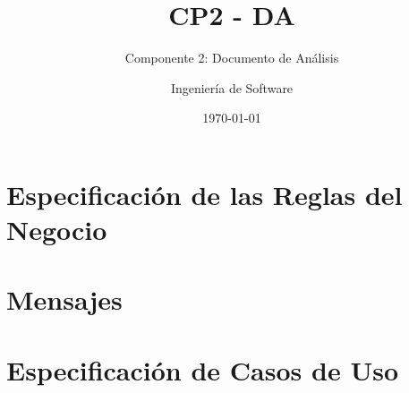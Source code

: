 \documentclass[10pt]{book}
\title{CP2 - DA}
\subtitle{Componente 2: Documento de Análisis}
\author{Ingeniería de Software}
\date{\today}
\begin{document}
\maketitle
\thispagestyle{empty}
\tableofcontents
\chapter{Especificación de las Reglas del Negocio}

\chapter{Mensajes}

%
%
%
%
%

\chapter{Especificación de Casos de Uso}
%
%
%

%
\end{document}
